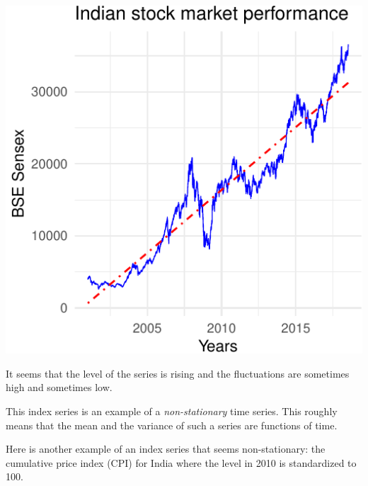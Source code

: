 \documentclass[11pt,]{article}
\begin{document}
\begin{center}\includegraphics{FMC_T4_PhD_Fin_Time_Series_files/figure-latex/BSE-2} \end{center}

It seems that the level of the series is rising and the fluctuations are
sometimes high and sometimes low.

This index series is an example of a \emph{non-stationary} time series.
This roughly means that the mean and the variance of such a series are
functions of time.

Here is another example of an index series that seems non-stationary:
the cumulative price index (CPI) for India where the level in 2010 is
standardized to 100.
\end{document}
